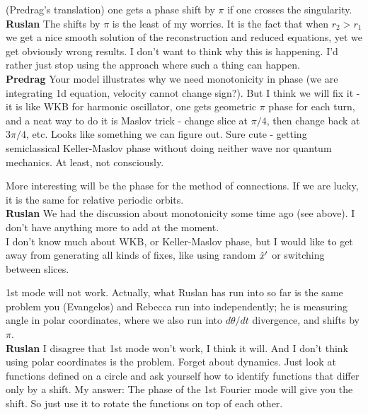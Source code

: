  (Predrag's translation) one gets a
phase shift by $\pi$ if one crosses the singularity.
\\
{\bf Ruslan} The shifts by $\pi$ is the least of my worries.
It is the fact that when $r_2 > r_1$ we get a nice smooth
solution of the reconstruction and reduced equations, yet we
get obviously wrong results.  I don't want to think why this
is happening.  I'd rather just stop using the approach where
such a thing can happen.
\\
{\bf Predrag} Your model illustrates why we need
monotonicity in phase (we are integrating 1d equation,
velocity cannot change sign?). But I think we will fix it -
it is like WKB for harmonic oscillator, one gets geometric
$\pi$ phase for each turn, and a neat way to do it is Maslov
trick - change slice at $\pi/4$, then change back at
$3\pi/4$, etc. Looks like something we can figure out. Sure
cute - getting semiclassical Keller-Maslov phase without
doing neither wave nor quantum mechanics. At least, not
consciously.

More interesting will be the phase for the method of
connections. If we are lucky, it is the same for relative
periodic orbits.
\\
{\bf Ruslan} We had the discussion about monotonicity some
time ago (see above).  I don't have anything more to add at
the moment.
\\
I don't know much about WKB, or Keller-Maslov
phase, but I would like to get away from generating all kinds
of fixes, like using random ${\hat{x}'}$ or switching between
slices.

\medskip{} 1st mode will not work. Actually,
what Ruslan has run into so far is the same problem you
(Evangelos) and Rebecca run into independently; he is
measuring angle in polar coordinates, where we also run into
$d\theta/dt$ divergence, and shifts by $\pi$.
\\
{\bf Ruslan} I disagree that 1st mode won't work, I think it
will. And I don't think using polar coordinates is the
problem.  Forget about dynamics.  Just look at functions
defined on a circle and ask yourself how to identify
functions that differ only by a shift.  My answer: The phase
of the 1st Fourier mode will give you the shift.  So just use
it to rotate the functions on top of each other.

